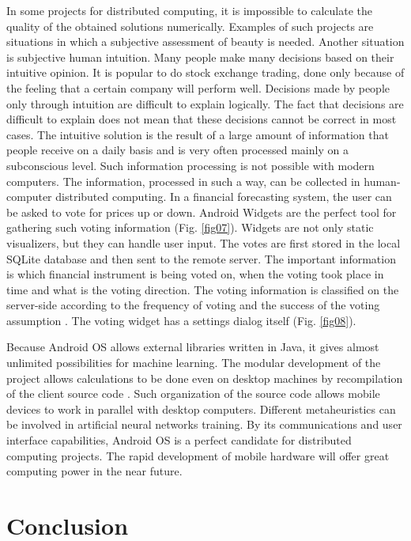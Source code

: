 \documentclass[a4paper,conference]{IEEEtran}
\begin{document}
In some projects for distributed computing, it is impossible to calculate the quality of the obtained solutions numerically. Examples of such projects are situations in which a subjective assessment of beauty is needed. Another situation is subjective human intuition. Many people make many decisions based on their intuitive opinion. It is popular to do stock exchange trading, done only because of the feeling that a certain company will perform well. Decisions made by people only through intuition are difficult to explain logically. The fact that decisions are difficult to explain does not mean that these decisions cannot be correct in most cases. The intuitive solution is the result of a large amount of information that people receive on a daily basis and is very often processed mainly on a subconscious level. Such information processing is not possible with modern computers. The information, processed in such a way, can be collected in human-computer distributed computing. In a financial forecasting system, the user can be asked to vote for prices up or down. Android Widgets are the perfect tool for gathering such voting information (Fig. \ref{fig07}). Widgets are not only static visualizers, but they can handle user input. The votes are first stored in the local SQLite database and then sent to the remote server. The important information is which financial instrument is being voted on, when the voting took place in time and what is the voting direction. The voting information is classified on the server-side according to the frequency of voting and the success of the voting assumption \cite{Ketipov-01}. The voting widget has a settings dialog itself (Fig. \ref{fig08}).

Because Android OS allows external libraries written in Java, it gives almost unlimited possibilities for machine learning. The modular development of the project allows calculations to be done even on desktop machines by recompilation of the client source code \cite{Balabanov-01}. Such organization of the source code allows mobile devices to work in parallel with desktop computers. Different metaheuristics can be involved in artificial neural networks training. By its communications and user interface capabilities, Android OS is a perfect candidate for distributed computing projects. The rapid development of mobile hardware will offer great computing power in the near future. 

\section{Conclusion}
\end{document}
